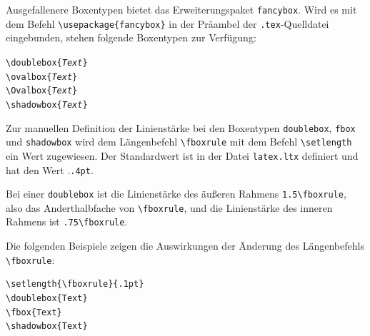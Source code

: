 \documentclass[a4paper,10pt,twoside]{scrbook}
\begin{document}
Ausgefallenere Boxentypen bietet das Erweiterungspaket \verb!fancybox!. Wird es mit dem Befehl \verb!\usepackage{fancybox}! in der Präambel der \verb!.tex!-Quelldatei eingebunden, stehen folgende Boxentypen zur Verfügung:


\begin{center}
\hspace{5mm}
\hspace{5mm}
\hspace{5mm}
\end{center}


\begin{boxedminipage}{\textwidth}
\texttt{\textbackslash doublebox\{\textsl{Text}\}}\\
\texttt{\textbackslash ovalbox\{\textsl{Text}\}}\\
\texttt{\textbackslash Ovalbox\{\textsl{Text}\}}\\
\texttt{\textbackslash shadowbox\{\textsl{Text}\}}
\end{boxedminipage}


Zur manuellen Definition der Linienstärke bei den Boxentypen \verb!doublebox!, \verb!fbox! und \verb!shadowbox! wird dem Längenbefehl \verb!\fboxrule! mit dem Befehl \verb!\setlength! ein Wert zugewiesen. Der Standardwert ist in der Datei \verb!latex.ltx! definiert und hat den Wert .\verb!.4pt!. 

Bei einer \verb!doublebox! ist die Linienstärke des äußeren Rahmens \verb!1.5\fboxrule!, also das Anderthalbfache von \verb!\fboxrule!, und die Linienstärke des inneren Rahmens ist \verb!.75\fboxrule!.

Die folgenden Beispiele zeigen die Auswirkungen der Änderung des Längenbefehls \verb!\fboxrule!:

\begin{minipage}[c]{0.5\textwidth}
\setlength{\parskip}{1em}
\setlength{\fboxrule}{.1pt}
\hspace{5mm}
\hspace{5mm}
\hspace{5mm}
\hfill
\end{minipage}
\hfill
\begin{minipage}[c]{0.48\textwidth}
\setlength{\parskip}{1em}
\begin{lstlisting}[label=fboxrule1, style=customlatex]
\setlength{\fboxrule}{.1pt}
\doublebox{Text} 
\fbox{Text}
\shadowbox{Text}
\end{lstlisting}
\end{minipage}
\end{document}
